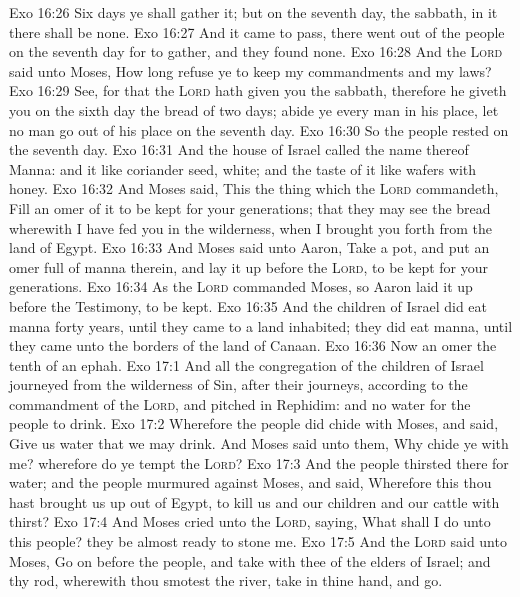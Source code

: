 \vs Exo 16:26 Six days ye shall gather it; but on the seventh day,  the sabbath, in it there shall be none.
\vs Exo 16:27 And it came to pass,  there went out  of the people on the seventh day for to gather, and they found none.
\vs Exo 16:28 And the \textsc{Lord} said unto Moses, How long refuse ye to keep my commandments and my laws?
\vs Exo 16:29 See, for that the \textsc{Lord} hath given you the sabbath, therefore he giveth you on the sixth day the bread of two days; abide ye every man in his place, let no man go out of his place on the seventh day.
\vs Exo 16:30 So the people rested on the seventh day.
\vs Exo 16:31 And the house of Israel called the name thereof Manna: and it  like coriander seed, white; and the taste of it  like wafers  with honey.
\vs Exo 16:32 And Moses said, This  the thing which the \textsc{Lord} commandeth, Fill an omer of it to be kept for your generations; that they may see the bread wherewith I have fed you in the wilderness, when I brought you forth from the land of Egypt.
\vs Exo 16:33 And Moses said unto Aaron, Take a pot, and put an omer full of manna therein, and lay it up before the \textsc{Lord}, to be kept for your generations.
\vs Exo 16:34 As the \textsc{Lord} commanded Moses, so Aaron laid it up before the Testimony, to be kept.
\vs Exo 16:35 And the children of Israel did eat manna forty years, until they came to a land inhabited; they did eat manna, until they came unto the borders of the land of Canaan.
\vs Exo 16:36 Now an omer  the tenth  of an ephah.
\vs Exo 17:1 And all the congregation of the children of Israel journeyed from the wilderness of Sin, after their journeys, according to the commandment of the \textsc{Lord}, and pitched in Rephidim: and  no water for the people to drink.
\vs Exo 17:2 Wherefore the people did chide with Moses, and said, Give us water that we may drink. And Moses said unto them, Why chide ye with me? wherefore do ye tempt the \textsc{Lord}?
\vs Exo 17:3 And the people thirsted there for water; and the people murmured against Moses, and said, Wherefore  this  thou hast brought us up out of Egypt, to kill us and our children and our cattle with thirst?
\vs Exo 17:4 And Moses cried unto the \textsc{Lord}, saying, What shall I do unto this people? they be almost ready to stone me.
\vs Exo 17:5 And the \textsc{Lord} said unto Moses, Go on before the people, and take with thee of the elders of Israel; and thy rod, wherewith thou smotest the river, take in thine hand, and go.
